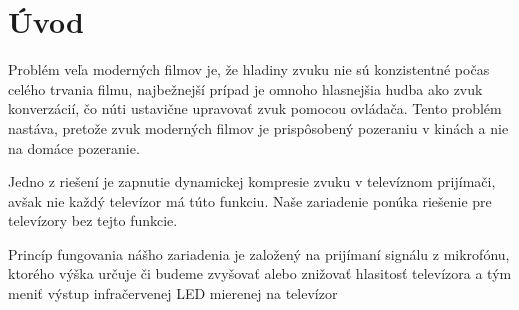 \chapter*{Úvod}
\label{UVOD}

Problém veľa moderných filmov je, že hladiny zvuku nie sú konzistentné počas celého trvania filmu, najbežnejší prípad je omnoho hlasnejšia hudba ako zvuk konverzácií, čo núti ustavične upravovať zvuk pomocou ovládača. Tento problém nastáva, pretože zvuk moderných filmov je prispôsobený pozeraniu v kinách a nie na domáce pozeranie.

Jedno z riešení je zapnutie dynamickej kompresie zvuku v televíznom prijímači, avšak nie každý televízor má túto funkciu. Naše zariadenie ponúka riešenie pre televízory bez tejto funkcie.

Princíp fungovania nášho zariadenia je založený na prijímaní signálu z mikrofónu, ktorého výška určuje či budeme zvyšovať alebo znižovať hlasitosť televízora a tým meniť výstup infračervenej LED mierenej na televízor



